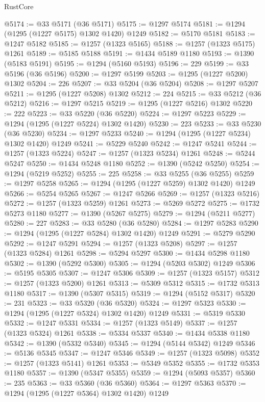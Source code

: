 \begin{lexlean}{RustCore}
\begin{coremodule}
@5174 := @33 @5171 (@36 @5171)
@5175 := @1297 @5174
@5181 := @1294 (@1295 (@1227 @5175) @1302 @1420) @1249
@5182 := @5170 @5181
@5183 := @1247 @5182
@5185 := @1257 (@1323 @5165)
@5188 := @1257 (@1323 @5175) @1261
@5189 := @5185 @5188
@5191 := @1434 @5189 @1180
@5193 := @1390 (@5183 @5191)
@5195 := @1294 (@5160 @5193)
@5196 := 229
@5199 := @33 @5196 (@36 @5196)
@5200 := @1297 @5199
@5203 := @1295 (@1227 @5200) @1302
@5204 := 226
@5207 := @33 @5204 (@36 @5204)
@5208 := @1297 @5207
@5211 := @1295 (@1227 @5208) @1302
@5212 := 224
@5215 := @33 @5212 (@36 @5212)
@5216 := @1297 @5215
@5219 := @1295 (@1227 @5216) @1302
@5220 := 222
@5223 := @33 @5220 (@36 @5220)
@5224 := @1297 @5223
@5229 := @1294 (@1295 (@1227 @5224) @1302 @1420)
@5230 := 223
@5233 := @33 @5230 (@36 @5230)
@5234 := @1297 @5233
@5240 := @1294 (@1295 (@1227 @5234) @1302 @1420) @1249
@5241 := @5229 @5240
@5242 := @1247 @5241
@5244 := @1257 (@1323 @5224)
@5247 := @1257 (@1323 @5234) @1261
@5248 := @5244 @5247
@5250 := @1434 @5248 @1180
@5252 := @1390 (@5242 @5250)
@5254 := @1294 (@5219 @5252)
@5255 := 225
@5258 := @33 @5255 (@36 @5255)
@5259 := @1297 @5258
@5265 := @1294 (@1295 (@1227 @5259) @1302 @1420) @1249
@5266 := @5254 @5265
@5267 := @1247 @5266
@5269 := @1257 (@1323 @5216)
@5272 := @1257 (@1323 @5259) @1261
@5273 := @5269 @5272
@5275 := @1732 @5273 @1180
@5277 := @1390 (@5267 @5275)
@5279 := @1294 (@5211 @5277)
@5280 := 227
@5283 := @33 @5280 (@36 @5280)
@5284 := @1297 @5283
@5290 := @1294 (@1295 (@1227 @5284) @1302 @1420) @1249
@5291 := @5279 @5290
@5292 := @1247 @5291
@5294 := @1257 (@1323 @5208)
@5297 := @1257 (@1323 @5284) @1261
@5298 := @5294 @5297
@5300 := @1434 @5298 @1180
@5302 := @1390 (@5292 @5300)
@5305 := @1294 (@5203 @5302) @1249
@5306 := @5195 @5305
@5307 := @1247 @5306
@5309 := @1257 (@1323 @5157)
@5312 := @1257 (@1323 @5200) @1261
@5313 := @5309 @5312
@5315 := @1732 @5313 @1180
@5317 := @1390 (@5307 @5315)
@5319 := @1294 (@5152 @5317)
@5320 := 231
@5323 := @33 @5320 (@36 @5320)
@5324 := @1297 @5323
@5330 := @1294 (@1295 (@1227 @5324) @1302 @1420) @1249
@5331 := @5319 @5330
@5332 := @1247 @5331
@5334 := @1257 (@1323 @5149)
@5337 := @1257 (@1323 @5324) @1261
@5338 := @5334 @5337
@5340 := @1434 @5338 @1180
@5342 := @1390 (@5332 @5340)
@5345 := @1294 (@5144 @5342) @1249
@5346 := @5136 @5345
@5347 := @1247 @5346
@5349 := @1257 (@1323 @5098)
@5352 := @1257 (@1323 @5141) @1261
@5353 := @5349 @5352
@5355 := @1732 @5353 @1180
@5357 := @1390 (@5347 @5355)
@5359 := @1294 (@5093 @5357)
@5360 := 235
@5363 := @33 @5360 (@36 @5360)
@5364 := @1297 @5363
@5370 := @1294 (@1295 (@1227 @5364) @1302 @1420) @1249

\end{coremodule}
\end{lexlean}

